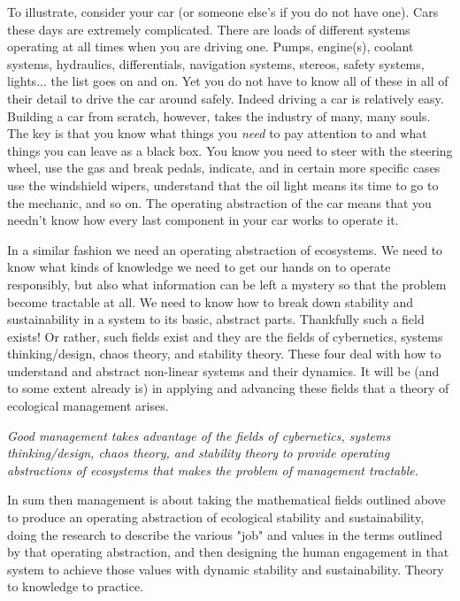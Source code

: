 \documentclass[11pt,a5paper]{article}
\begin{document}
To illustrate, consider your car (or someone else's if you do not have one). Cars these days are extremely complicated. There are loads of different systems operating at all times when you are driving one. Pumps, engine(s), coolant systems, hydraulics, differentials, navigation systems, stereos, safety systems, lights... the list goes on and on. Yet you do not have to know all of these in all of their detail to drive the car around safely. Indeed driving a car is relatively easy. Building a car from scratch, however, takes the industry of many, many souls. The key is that you know what things you \textit{need} to pay attention to and what things you can leave as a black box. You know you need to steer with the steering wheel, use the gas and break pedals, indicate, and in certain more specific cases use the windshield wipers, understand that the oil light means its time to go to the mechanic, and so on. The operating abstraction of the car means that you needn't know how every last component in your car works to operate it. 

In a similar fashion we need an operating abstraction of ecosystems. We need to know what kinds of knowledge we need to get our hands on to operate responsibly, but also what information can be left a mystery so that the problem become tractable at all. We need to know how to break down stability and sustainability in a system to its basic, abstract parts. Thankfully such a field exists! Or rather, such fields exist and they are the fields of cybernetics, systems thinking/design, chaos theory, and stability theory. These four deal with how to understand and abstract non-linear systems and their dynamics. It will be (and to some extent already is) in applying and advancing these fields that a theory of ecological management arises. \newline

\textit{Good management takes advantage of the fields of cybernetics, systems thinking/design, chaos theory, and stability theory to provide operating abstractions of ecosystems that makes the problem of management tractable.}\newline

In sum then management is about taking the mathematical fields outlined above to produce an operating abstraction of ecological stability and sustainability, doing the research to describe the various "job" and values in the terms outlined by that operating abstraction, and then designing the human engagement in that system to achieve those values with dynamic stability and sustainability. Theory to knowledge to practice. \newline
\end{document}
